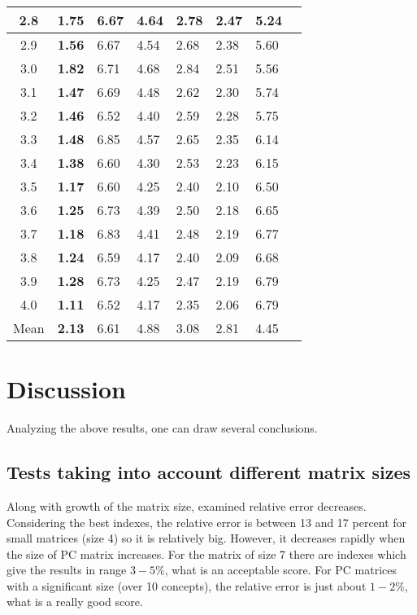 \begin{table}[!ht]
\begin{center}
\begin{tabular}{|c||lllll||l|c|}
2.8 & \textbf{1.75} & 6.67 & 4.64 & 2.78 & 2.47 & 5.24 \\ \hline
2.9 & \textbf{1.56} & 6.67 & 4.54 & 2.68 & 2.38 & 5.60 \\ \hline
3.0 & \textbf{1.82} & 6.71 & 4.68 & 2.84 & 2.51 & 5.56 \\ \hline
3.1 & \textbf{1.47} & 6.69 & 4.48 & 2.62 & 2.30 & 5.74 \\ \hline
3.2 & \textbf{1.46} & 6.52 & 4.40 & 2.59 & 2.28 & 5.75 \\ \hline
3.3 & \textbf{1.48} & 6.85 & 4.57 & 2.65 & 2.35 & 6.14 \\ \hline
3.4 & \textbf{1.38} & 6.60 & 4.30 & 2.53 & 2.23 & 6.15 \\ \hline
3.5 & \textbf{1.17} & 6.60 & 4.25 & 2.40 & 2.10 & 6.50 \\ \hline
3.6 & \textbf{1.25} & 6.73 & 4.39 & 2.50 & 2.18 & 6.65 \\ \hline
3.7 & \textbf{1.18} & 6.83 & 4.41 & 2.48 & 2.19 & 6.77 \\ \hline
3.8 & \textbf{1.24} & 6.59 & 4.17 & 2.40 & 2.09 & 6.68 \\ \hline
3.9 & \textbf{1.28} & 6.73 & 4.25 & 2.47 & 2.19 & 6.79 \\ \hline
4.0 & \textbf{1.11} & 6.52 & 4.17 & 2.35 & 2.06 & 6.79 \\ \hline \hline
Mean & \textbf{2.13} & 6.61 & 4.88 & 3.08 & 2.81 & 4.45 \\ \hline 
\end{tabular}
\end{center}
\end{table}


\section{Discussion}
Analyzing the above results, one can draw several conclusions.

\subsection{Tests taking into account different matrix sizes}
Along with growth of the matrix size, examined relative error decreases. Considering the best indexes, the relative error is between 13 and 17 percent for small matrices (size 4) so it is relatively big. However, it decreases rapidly when the size of PC matrix increases. For the matrix of size 7 there are indexes which give the results in range $3 - 5 \%$, what is an acceptable score. For PC matrices with a significant size (over 10 concepts), the relative error is just about $1 - 2 \%$, what is a really good score.

